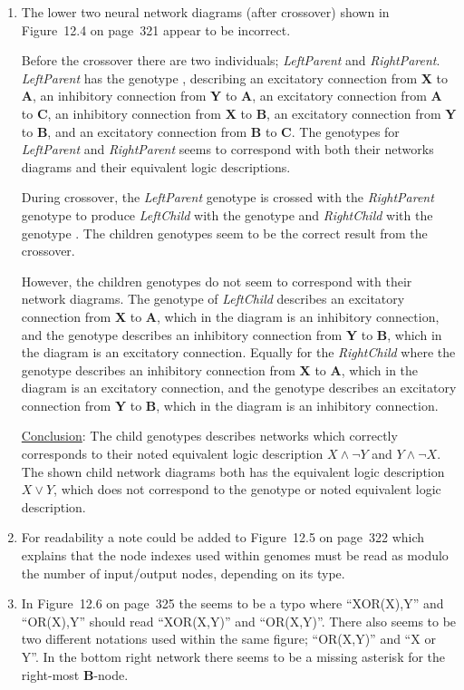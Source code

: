 \begin{enumerate}
\item {\color{WildStrawberry} The lower two neural network diagrams (after crossover) shown in Figure~12.4 on page~321 appear to be incorrect.}

Before the crossover there are two individuals; \textit{LeftParent} and \textit{RightParent}. \textit{LeftParent} has the genotype , describing an excitatory connection from \textbf{X} to \textbf{A}, an inhibitory connection from \textbf{Y} to \textbf{A}, an excitatory connection from \textbf{A} to \textbf{C}, an inhibitory connection from \textbf{X} to \textbf{B}, an excitatory connection from \textbf{Y} to \textbf{B}, and an excitatory connection from \textbf{B} to \textbf{C}. {\color{ForestGreen} The genotypes for \textit{LeftParent} and \textit{RightParent} seems to correspond with both their networks diagrams and their equivalent logic descriptions.}

During crossover, the \textit{LeftParent} genotype  is crossed with the \textit{RightParent} genotype  to produce \textit{LeftChild} with the genotype  and \textit{RightChild} with the genotype . {\color{ForestGreen} The children genotypes seem to be the correct result from the crossover.}

However, the children genotypes do not seem to correspond with their network diagrams. The genotype of \textit{LeftChild} describes an excitatory connection from \textbf{X} to \textbf{A}, which in the diagram is an inhibitory connection, and the genotype describes an inhibitory connection from \textbf{Y} to \textbf{B}, which in the diagram is an excitatory connection. Equally for the \textit{RightChild} where the genotype describes an inhibitory connection from \textbf{X} to \textbf{A}, which in the diagram is an excitatory connection, and the genotype describes an excitatory connection from \textbf{Y} to \textbf{B}, which in the diagram is an inhibitory connection.

\underline{Conclusion}: {\color{ForestGreen} The child genotypes describes networks which correctly corresponds to their noted equivalent logic description $X \land \neg Y$ and $Y \land \neg X$.} {\color{WildStrawberry} The shown child network diagrams both has the equivalent logic description $X \lor Y$, which does not correspond to the genotype or noted equivalent logic description.}

\item For readability a note could be added to Figure~12.5 on page~322 which explains that the node indexes used within genomes must be read as modulo the number of input/output nodes, depending on its type.

\item In Figure~12.6 on page~325 the seems to be a typo where ``XOR(X),Y'' and ``OR(X),Y'' should read ``XOR(X,Y)'' and ``OR(X,Y)''. There also seems to be two different notations used within the same figure; ``OR(X,Y)'' and ``X or Y''. In the bottom right network there seems to be a missing asterisk for the right-most \textbf{B}-node.
\end{enumerate}



